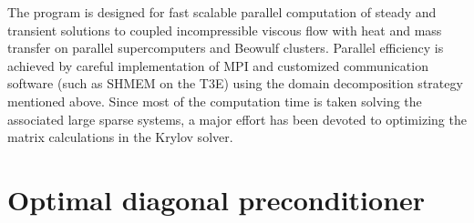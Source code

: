 The program is designed for fast scalable parallel computation of steady
and transient solutions to coupled incompressible viscous flow with heat
and mass transfer on parallel supercomputers and Beowulf clusters.
Parallel efficiency is achieved by careful
implementation of MPI and customized communication software (such as
SHMEM on the T3E) using the domain decomposition strategy mentioned
above. Since most of the computation time is taken solving the
associated large sparse systems, a major effort has been devoted to
optimizing the matrix calculations in the Krylov solver.


\section{Optimal diagonal preconditioner\label{precond}}

